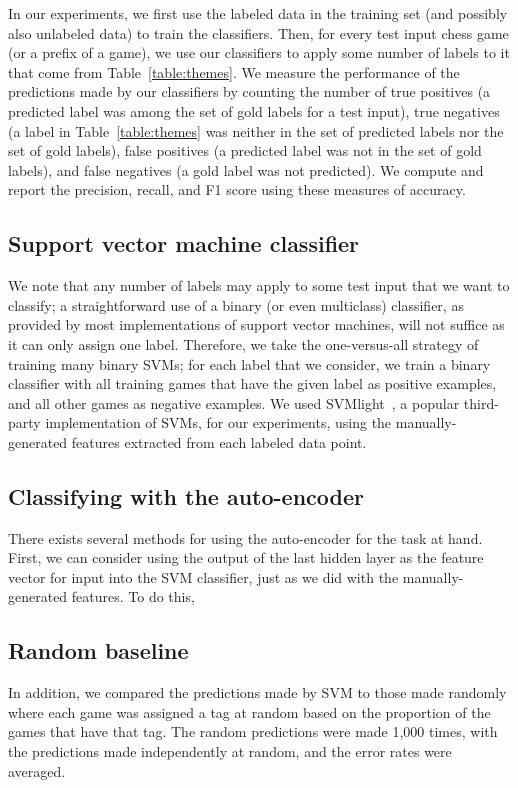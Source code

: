 \documentclass[11pt]{article}
\begin{document}
In our experiments, we first use the labeled data in the training set (and possibly also unlabeled data) to train the classifiers. Then, for every test input chess game (or a prefix of a game), we use our classifiers to apply some number of labels to it that come from Table~\ref{table:themes}. We measure the performance of the predictions made by our classifiers by counting the number of true positives (a predicted label was among the set of gold labels for a test input), true negatives (a label in Table~\ref{table:themes} was neither in the set of predicted labels nor the set of gold labels), false positives (a predicted label was not in the set of gold labels), and false negatives (a gold label was not predicted). We compute and report the precision, recall, and F1 score using these measures of accuracy.

\subsection{Support vector machine classifier}
We note that any number of labels may apply to some test input that we want to classify; a straightforward use of a binary (or even multiclass) classifier, as provided by most implementations of support vector machines, will not suffice as it can only assign one label. Therefore, we take the one-versus-all strategy of training many binary SVMs; for each label that we consider, we train a binary classifier with all training games that have the given label as positive examples, and all other games as negative examples. We used SVMlight~\cite{svmlight}, a popular third-party implementation of SVMs, for our experiments, using the manually-generated features extracted from each labeled data point.

\subsection{Classifying with the auto-encoder}
There exists several methods for using the auto-encoder for the task at hand. First, we can consider using the output of the last hidden layer as the feature vector for input into the SVM classifier, just as we did with the manually-generated features. To do this, 

\subsection{Random baseline}
In addition, we compared the predictions made by SVM to those made randomly where each game was assigned a tag at random based on the proportion of the games that have that tag. The random predictions were made 1,000 times, with the predictions made independently at random, and the error rates were averaged.
\end{document}
